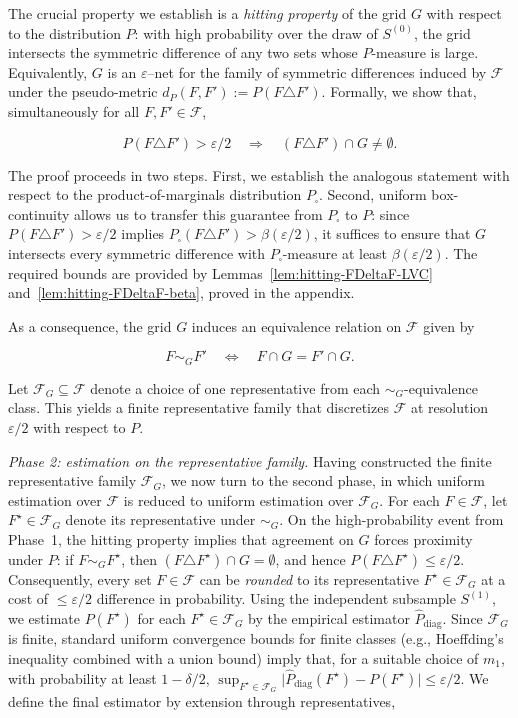 \documentclass[arxiv]{colt2026}
\newcommand{\F}{\mathcal{F}}
\newcommand{\eps}{\varepsilon}
\newcommand{\diag}{\mathrm{diag}}
\begin{document}
The crucial property we establish is a \emph{hitting property} of the grid $G$
with respect to the distribution $P$: with high probability over the draw of
$S^{(0)}$, the grid intersects the symmetric difference of any two sets whose
$P$-measure is large. 
{Equivalently, $G$ is an $\varepsilon$--net for the family of symmetric differences
induced by $\F$ under the pseudo-metric
$d_P(F,F') := P(F\triangle F')$.}
Formally, we show that, simultaneously for all $F,F'\in\F$,

\vspace{-0.5em}
\[
P(F\triangle F') > \eps/2
\quad\Longrightarrow\quad
(F\triangle F')\cap G \neq \emptyset .
\]

\vspace{-0.1em}
The proof proceeds in two steps.
First, we establish the analogous statement with respect to the
product-of-marginals distribution $P_{\square}$.
Second, uniform box-continuity allows us to transfer this guarantee from
$P_{\square}$ to $P$: since
$P(F\triangle F') > \varepsilon/2$ implies
$P_{\square}(F\triangle F') > \beta(\varepsilon/2)$,
it suffices to ensure that $G$ intersects every symmetric difference with
$P_{\square}$-measure at least $\beta(\varepsilon/2)$.
The required bounds are provided by
Lemmas~\ref{lem:hitting-FDeltaF-LVC} and~\ref{lem:hitting-FDeltaF-beta}, proved in
the appendix.

As a consequence, the grid $G$ induces an equivalence relation on $\F$ given by

\vspace{-0.5em}
\[
F \sim_G F'
\quad\Longleftrightarrow\quad
F\cap G = F'\cap G .
\]

\vspace{-0.3em}
Let $\F_G \subseteq \F$ denote a choice of one representative from each
$\sim_G$-equivalence class.
This yields a finite representative family that discretizes $\F$ at resolution
$\varepsilon/2$ with respect to $P$.
\smallskip

\noindent\emph{Phase 2: estimation on the representative family.}
Having constructed the finite representative family $\F_G$, we now turn to the
second phase, in which uniform estimation over $\F$ is reduced to uniform
estimation over $\F_G$.
For each $F\in\F$, let $F^\star\in\F_G$ denote its representative under
$\sim_G$.
On the high-probability event from Phase~1, the hitting property implies that
agreement on $G$ forces proximity under $P$: if $F\sim_G F^\star$, then
$(F\triangle F^\star)\cap G=\emptyset$, and hence
\(
P(F\triangle F^\star)\le \eps/2 .
\)
Consequently, every set $F\in\F$ can be \emph{rounded} to its representative
$F^\star\in\F_G$ at a cost of $\leq\eps/2$ difference in probability.
Using the independent subsample $S^{(1)}$, we estimate $P(F^\star)$ for each
$F^\star\in\F_G$ by the empirical estimator $\widehat P_{\diag}$.
Since $\F_G$ is finite, standard uniform convergence bounds for finite classes
(e.g., Hoeffding's inequality combined with a union bound) imply that, for a
suitable choice of $m_1$, with probability at least $1-\delta/2$,
\(
\sup_{F^\star\in\F_G}
\bigl|\widehat P_{\diag}(F^\star)-P(F^\star)\bigr|
\le \eps/2.
\)
We define the final estimator by extension through representatives,
\end{document}
